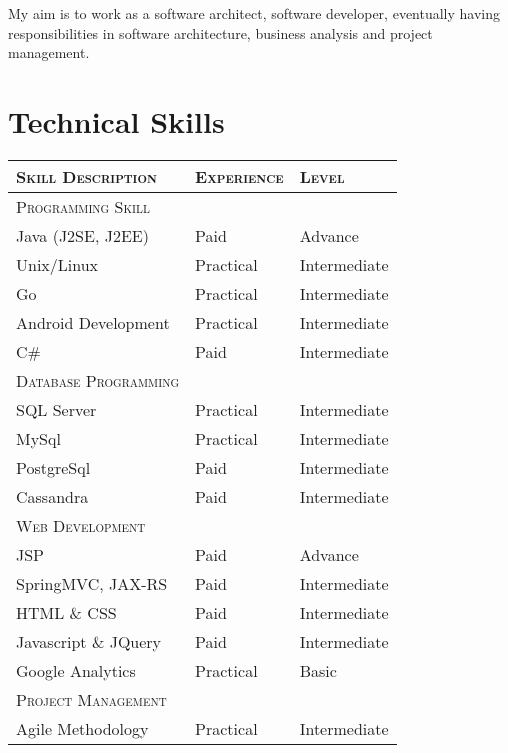 \documentclass[a4paper,10pt]{article} %
\begin{document}
My aim is to work as a software architect, software developer, eventually having responsibilities in software architecture, business analysis and project management.


\section{Technical Skills}

    \begin{tabular}{l|l|l}
   
    \textsc{Skill Description} & \textsc{Experience}  & \textsc{Level} \\ \hline
    \textsc{Programming Skill}\\ \hline
    Java (J2SE, J2EE) & Paid & Advance \\
    Unix/Linux & Practical & Intermediate \\ 
    Go & Practical & Intermediate \\
    Android Development & Practical & Intermediate\\
    C\# & Paid & Intermediate \\ 
    \hline 
    \textsc{Database Programming} \\ \hline
    SQL Server & Practical & Intermediate \\ 
    MySql & Practical & Intermediate \\ 
    PostgreSql & Paid & Intermediate \\ 
    Cassandra & Paid & Intermediate \\ \hline
    \textsc{Web Development} \\ \hline
    JSP & Paid & Advance \\ 
    SpringMVC, JAX-RS & Paid & Intermediate \\ 
    HTML \& CSS & Paid & Intermediate \\ 
    Javascript \& JQuery & Paid & Intermediate \\
    Google Analytics & Practical & Basic \\ 
    \hline
    \textsc{Project Management}\\ \hline
    Agile Methodology & Practical & Intermediate \\ 
    \end{tabular}
\end{document}
